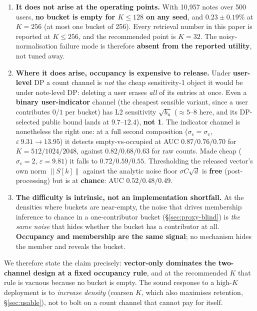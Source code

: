 \documentclass[pdflatex,sn-mathphys-num,12pt]{sn-jnl}
\theoremstyle{thmstyleone}%
\theoremstyle{thmstyletwo}%
\theoremstyle{thmstylethree}%
\newcommand{\eps}{\varepsilon}
\newcommand{\norm}[1]{\left\lVert #1 \right\rVert}
\newcommand{\secref}[1]{\S\ref{#1}}
\begin{document}
\begin{enumerate}
  \item \textbf{It does not arise at the operating points.} With 10{,}957 notes over
    500 users, \textbf{no bucket is empty for $K \leq 128$ on any seed}, and
    $0.23 \pm 0.19\%$ at $K = 256$ (at most one bucket of 256). Every retrieval
    number in this paper is reported at $K \leq 256$, and the recommended point is
    $K = 32$. The noisy-normalisation failure mode is therefore \textbf{absent from
    the reported utility}, not tuned away.

  \item \textbf{Where it does arise, occupancy is expensive to release.} Under
    \textbf{user-level} DP a count channel is \emph{not} the cheap sensitivity-1
    object it would be under note-level DP: deleting a user erases \emph{all} of its
    entries at once. Even a \textbf{binary user-indicator} channel (the cheapest
    sensible variant, since a user contributes $0/1$ per bucket) has L2 sensitivity
    $\sqrt{b_u}$ ($\approx 5$--$8$ here, and its DP-selected public bound lands at
    $9.7$--$12.4$), \textbf{not 1}. The indicator channel is nonetheless the right
    one: at a full second composition ($\sigma_c = \sigma_v$, $\eps\ 9.31 \to 13.95$)
    it detects empty-vs-occupied at AUC $0.87 / 0.76 / 0.70$ for
    $K = 512 / 1024 / 2048$, against $0.82 / 0.68 / 0.63$ for raw counts. Made cheap
    ($\sigma_c = 2$, $\eps = 9.81$) it falls to $0.72 / 0.59 / 0.55$. Thresholding
    the released vector's own norm $\norm{S[k]}$ against the analytic noise floor
    $\sigma C \sqrt{d}$ is \textbf{free} (post-processing) but is at \textbf{chance}:
    AUC $0.52 / 0.48 / 0.49$.

  \item \textbf{The difficulty is intrinsic, not an implementation shortfall.} At the
    densities where buckets are near-empty, the noise that drives membership inference
    to chance in a one-contributor bucket (\secref{sec:proxy-blind}) is \emph{the same
    noise} that hides whether the bucket has a contributor at all. \textbf{Occupancy
    and membership are the same signal}; no mechanism hides the member and reveals the
    bucket.
\end{enumerate}

We therefore state the claim precisely: \textbf{vector-only dominates the two-channel
design at a fixed occupancy rule}, and at the recommended $K$ that rule is vacuous
because no bucket is empty. The sound response to a high-$K$ deployment is to
\emph{increase density} (coarsen $K$, which also maximises retention,
\secref{sec:usable}), not to bolt on a count channel that cannot pay for itself.
\end{document}
